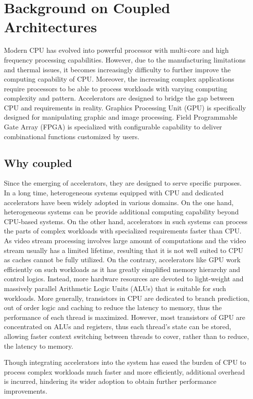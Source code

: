 \section{Background on Coupled Architectures} \label{sec:background}
Modern CPU has evolved into powerful processor with multi-core and high frequency processing capabilities. However, due to the manufacturing limitations and thermal issues, it becomes increasingly difficulty to further improve the computing capability of CPU. Moreover, the increasing complex applications require processors to be able to process workloads with varying computing complexity and pattern. Accelerators are designed to bridge the gap between CPU and requirements in reality. Graphics Processing Unit (GPU) is specifically designed for manipulating graphic and image processing. Field Programmable Gate Array (FPGA) is specialized with configurable capability to deliver combinational functions customized by users.

\subsection{Why coupled}
Since the emerging of accelerators, they are designed to serve specific purposes. In a long time, heterogeneous systems equipped with CPU and dedicated accelerators have been widely adopted in various domains. On the one hand, heterogeneous systems can be provide additional computing capability beyond CPU-based systems. On the other hand, accelerators in such systems can process the parts of complex workloads with specialized requirements faster than CPU. As video stream processing involves large amount of computations and the video stream usually has a limited lifetime, resulting that it is not well suited to CPU as caches cannot be fully utilized. On the contrary, accelerators like GPU work efficiently on such workloads as it has greatly simplified memory hierarchy and control logics. Instead, more hardware resources are devoted to light-weight and massively parallel Arithmetic Logic Units (ALUs) that is suitable for such workloads. More generally, transistors in CPU are dedicated to branch prediction, out of order logic and caching to reduce the latency to memory, thus the performance of each thread is maximized. However, most transistors of GPU are concentrated on ALUs and registers, thus each thread's state can be stored, allowing faster context switching between threads to cover, rather than to reduce, the latency to memory.

Though integrating accelerators into the system has eased the burden of CPU to process complex workloads much faster and more efficiently, additional overhead is incurred, hindering its wider adoption to obtain further performance improvements.

